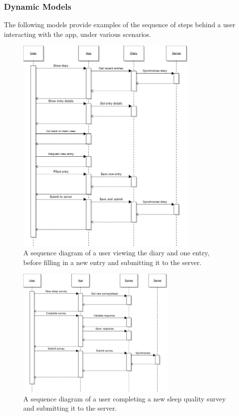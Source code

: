 \documentclass[a4paper, 11pt, titlepage]{article}
\begin{document}
\subsubsection{Dynamic Models}
The following models provide examples of the sequence of steps behind a user interacting with the app, under various scenarios.
\begin{figure}[H]
	\centering
	\includegraphics[width=0.8\textwidth]{figures/sequence-diagrams/AppDiarySeq.pdf}
	\caption{A sequence diagram of a user viewing the diary and one entry, before filling in a new entry and submitting it to the server.}
\end{figure}

\begin{figure}[H]
	\centering
	\includegraphics[width=0.7\textwidth]{figures/sequence-diagrams/AppSurveySeq.pdf}
	\caption{A sequence diagram of a user completing a new sleep quality survey and submitting it to the server.}
\end{figure}
\end{document}
